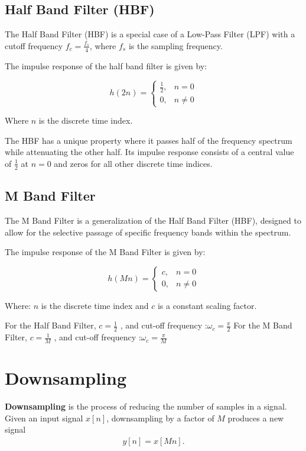\documentclass{article}
\begin{document}
\subsection{Half Band Filter (HBF)}

The Half Band Filter (HBF) is a special case of a Low-Pass Filter (LPF) with a cutoff frequency \(f_c = \frac{f_s}{4}\), where \(f_s\) is the sampling frequency.

The impulse response of the half band filter is given by:

\[
h{(2n)} = \begin{cases}
    \frac{1}{2}, & n = 0 \\
    0, & n \neq 0
\end{cases}
\]

Where \(n\) is the discrete time index.


The HBF has a unique property where it passes half of the frequency spectrum while attenuating the other half. Its impulse response consists of a central value of \(\frac{1}{2}\) at \(n = 0\) and zeros for all other discrete time indices.
\subsection{M Band Filter}

The M Band Filter is a generalization of the Half Band Filter (HBF), designed to allow for the selective passage of specific frequency bands within the spectrum.

The impulse response of the M Band Filter is given by:

\[
h{(Mn)} = \begin{cases}
    {c}, & n = 0 \\
    0, & n \neq 0
\end{cases}
\]

Where:
 \(n\) is the discrete time index and
\(c\) is a constant scaling factor.


 For the Half Band Filter, \(c = \frac{1}{2}\) , and cut-off frequency :$\omega_c= \frac{\pi}{2}$
   For the M Band Filter, \(c = \frac{1}{M}\) , and cut-off frequency :$\omega_c= \frac{\pi}{M}$

  
\section{Downsampling}


\textbf{Downsampling} is the process of reducing the number of samples in a signal. Given an input signal \(x[n]\), downsampling by a factor of \(M\) produces a new signal 
\begin{align}
y[n] = x[Mn].
\end{align}
\end{document}
